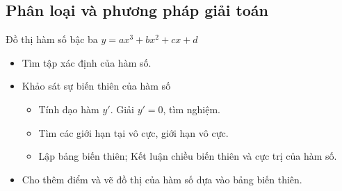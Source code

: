 \subsection{Phân loại và phương pháp giải toán}
\begin{dang}{Đồ thị hàm số bậc ba $y=ax^3+bx^2+cx+d$}
	\begin{itemize}
		\item[\iconCH]  Tìm tập xác định của hàm số.
		\item [\iconCH]  Khảo sát sự biến thiên của hàm số
		\begin{itemize}
			\item Tính đạo hàm $y'$. Giải $y'=0$, tìm nghiệm.
			\item Tìm các giới hạn tại vô cực, giới hạn vô cực.
			\item Lập bảng biến thiên; Kết luận chiều biến thiên và cực trị của hàm số.
		\end{itemize}
		\item [\iconCH]  Cho thêm điểm và vẽ đồ thị của hàm số dựa vào bảng biến thiên.
	\end{itemize}
\end{dang}
